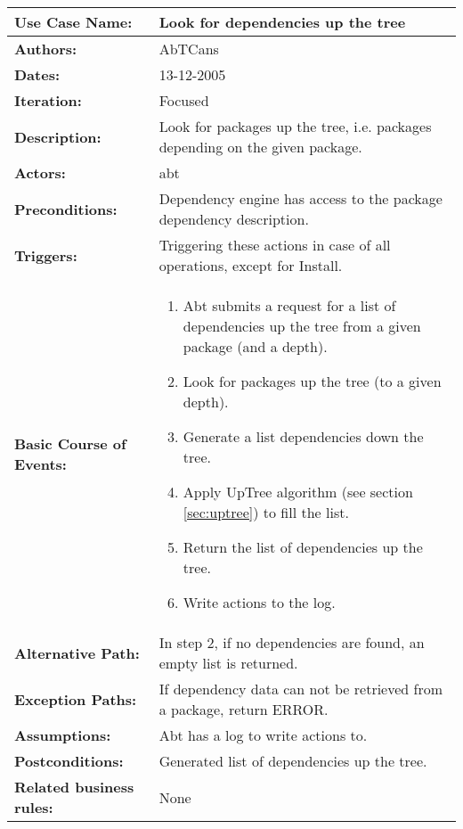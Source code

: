 \begin{tabularx}{\linewidth}{|l|X|}
\hline
\textbf{Use Case Name:} & \textbf{Look for dependencies up the tree} \\
\hline
\textbf{Authors:} & AbTCans\\
\hline
\textbf{Dates:} & 13-12-2005\\
\hline
\textbf{Iteration:} & Focused\\
\hline
\textbf{Description:} & Look for packages up the tree, i.e. packages depending on the given package.\\
\hline
\textbf{Actors:} & abt \\ 
\hline
\textbf{Preconditions:} & Dependency engine has access to the package dependency description.\\
\hline
\textbf{Triggers:} & Triggering these actions in case of all operations, except for Install.\\
\hline
\textbf{Basic Course of Events:} & 
\begin{minipage}{\linewidth} 
  \vspace{0.05em}
  \begin{enumerate}
   \item Abt submits a request for a list of dependencies up the tree from a given package (and a depth).
   \item Look for packages up the tree (to a given depth).
   \item Generate a list dependencies down the tree.
   \item Apply UpTree algorithm (see section \ref{sec:uptree}) to fill the list.
   \item Return the list of dependencies up the tree.
   \item Write actions to the log.
  \end{enumerate}
  \vspace{0.05em}
\end{minipage}
\\
\hline 
\textbf{Alternative Path:} & In step 2, if no dependencies are found, an empty list is returned.\\
\hline
\textbf{Exception Paths:} & If dependency data can not be retrieved from a package, return ERROR. \\
\hline
\textbf{Assumptions:} & Abt has a log to write actions to. \\
\hline

\textbf{Postconditions:} & Generated list of dependencies up the tree.\\
\hline
\textbf{Related business rules:} & None\\
\hline
\end{tabularx}


  